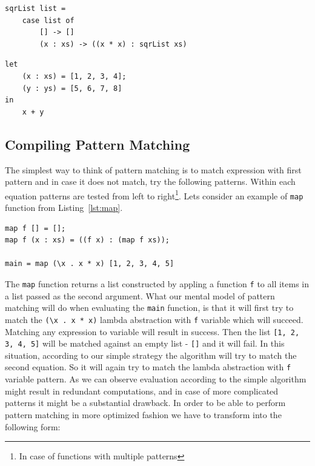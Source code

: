 \documentclass[12pt,a4paper]{report}
\begin{document}
\vspace*{0.2in}
\begin{lstlisting}[style=haskell,label=lst:case_pattern_matching,caption={Pattern matching in
case expressions.}]
sqrList list =
    case list of
        [] -> []
        (x : xs) -> ((x * x) : sqrList xs)
\end{lstlisting}

\vspace*{0.2in}
\begin{lstlisting}[style=haskell,label=lst:letrec_pattern_matching,caption={Pattern matching
  in let(rec) expressions.}]
let
    (x : xs) = [1, 2, 3, 4];
    (y : ys) = [5, 6, 7, 8]
in
    x + y
\end{lstlisting}

\subsection{Compiling Pattern Matching}
The simplest way to think of pattern matching is to match expression with first
pattern and in case it does not match, try the following patterns. Within each
equation patterns are tested from left to right\footnote{In case of functions
with multiple patterns}. Lets consider an example of \texttt{map} function from
Listing~\ref{lst:map}.

\vspace*{0.2in}
\begin{lstlisting}[style=haskell,label=lst:map,caption={Map function example.}]
map f [] = [];
map f (x : xs) = ((f x) : (map f xs));

main = map (\x . x * x) [1, 2, 3, 4, 5]
\end{lstlisting}

The \texttt{map} function returns a list constructed by appling a function
\texttt{f} to all items in a list passed as the second argument. What our
mental model of pattern matching will do when evaluating the \texttt{main}
function, is that it will first try to match the \texttt{(\textbackslash x . x
* x)} lambda abstraction with \texttt{f} variable which will succeed. Matching
any expression to variable will result in success. Then the list \texttt{[1, 2,
3, 4, 5]} will be matched against an empty list - \texttt{[]} and it will fail.
In this situation, according to our simple strategy the algorithm will try to
match the second equation. So it will again try to match the lambda abstraction
with \texttt{f} variable pattern. As we can observe evaluation according to the
simple algorithm might result in redundant computations, and in case of more
complicated patterns it might be a substantial drawback. In order to be able to
perform pattern matching in more optimized fashion we have to transform into
the following form:
\end{document}
